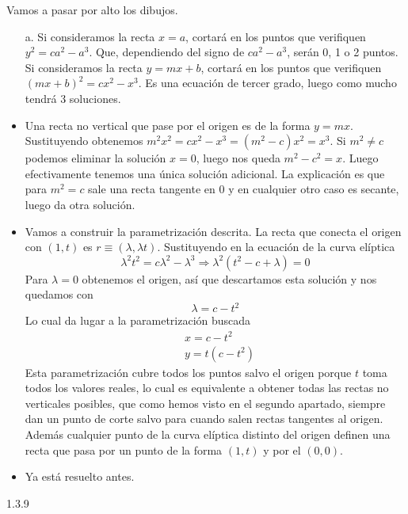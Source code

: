 \documentclass[twoside]{article}
\begin{document}
\begin{solucion}
Vamos a pasar por alto los dibujos. 
\begin{itemize}
\item[a.] Si consideramos la recta $x=a$, cortará en los puntos que verifiquen $y^2=ca^2-a^3$. Que, dependiendo del signo de $ca^2-a^3$, serán 0, 1 o 2 puntos.  Si consideramos la recta $y=mx+b$, cortará en los puntos que verifiquen $(mx+b)^2=cx^2-x^3$. Es una ecuación de tercer grado, luego como mucho tendrá 3 soluciones.
\item Una recta no vertical que pase por el origen es de la forma $y=mx$. Sustituyendo obtenemos $m^2x^2=cx^2-x^3=(m^2-c)x^2=x^3$. Si $m^2\neq c$ podemos eliminar la solución $x=0$, luego nos queda $m^2-c^2=x$. Luego efectivamente tenemos una única solución adicional. La explicación es que para $m^2=c$ sale una recta tangente en 0 y en cualquier otro caso es secante, luego da otra solución. 
\item Vamos a construir la parametrización descrita. La recta que conecta el origen con $(1,t)$ es $r\equiv (\lambda, \lambda t)$. Sustituyendo en la ecuación de la curva elíptica
\[
\lambda^2t^2=c\lambda^2-\lambda^3\Rightarrow \lambda^2(t^2-c+\lambda)=0
\]
Para $\lambda=0$ obtenemos el origen, así que descartamos esta solución y nos quedamos con
\[
\lambda=c-t^2
\]
Lo cual da lugar a la parametrización buscada
\begin{align*}
&x= c-t^2\\
&y=t(c-t^2)
\end{align*}
Esta parametrización cubre todos los puntos salvo el origen porque $t$ toma todos los valores reales, lo cual es equivalente a obtener todas las rectas no verticales posibles, que como hemos visto en el segundo apartado, siempre dan un punto de corte salvo para cuando salen rectas tangentes al origen. Además cualquier punto de la curva elíptica distinto del origen definen una recta que pasa por un punto de la forma $(1,t)$ y por el $(0,0)$. 
\item Ya está resuelto antes.
\end{itemize}
\end{solucion}

\newpage

\begin{ejercicio}{1.3.9}

\end{ejercicio}
\begin{solucion}

\end{solucion}
\end{document}

